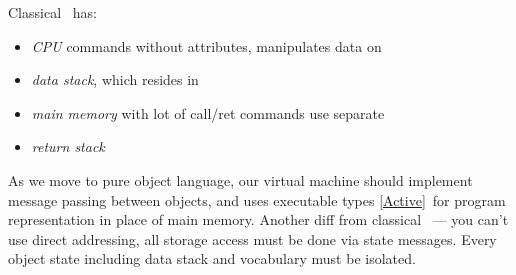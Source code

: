 \label{FVM}\secdown

Classical \F\ has:
\begin{itemize}[nosep]
  \item \emph{CPU} commands without attributes, manipulates data on
  \item \emph{data stack}, which resides in
  \item \emph{main memory} with lot of call/ret commands use separate
  \item \emph{return stack}
\end{itemize}

\noindent
As we move to pure object language, our virtual machine should implement message
passing between objects, and uses executable types \ref{Active}\ for program
representation in place of main memory. Another diff from classical \F\ --- you
can't use direct addressing, all storage access must be done via state messages.
Every object state including data stack and vocabulary must be isolated.

\secup
